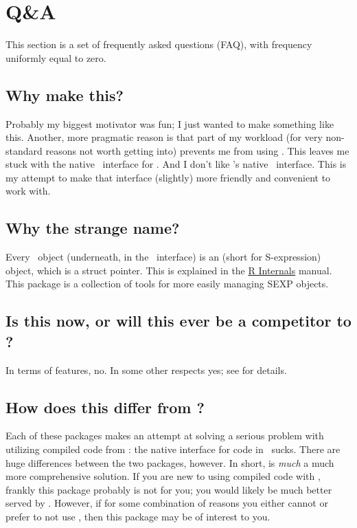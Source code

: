 \section{Q\&A}

This section is a set of frequently asked questions (FAQ), with frequency uniformly
equal to zero.


\subsection{Why make this?}

Probably my biggest motivator was fun; I just wanted to make something like this.  Another,
more pragmatic reason is that part of my workload (for very non-standard reasons not worth 
getting into) prevents me from using .  This leaves me stuck with the native \C\ 
interface for \R.  And I don't like \R's native \C\ interface.  This is my attempt to 
make that interface (slightly) more friendly and convenient to work with.


\subsection{Why the strange name?}

Every \R\ object (underneath, in the \C\ interface) is an  (short for
S-expression) object, which is a struct pointer.  This is explained in the
\href{http://cran.r-project.org/doc/manuals/R-ints.html#SEXPs}{R Internals} 
manual.  This package is a collection of tools for more easily managing SEXP 
objects.


\subsection{Is this now, or will this ever be a competitor to ?}
In terms of features, no.  In some other respects yes; see  for
details.


\subsection{How does this differ from ?}\label{sec:rcppdiffs}
Each of these packages makes an attempt at solving a serious problem with utilizing compiled
code from \R: the native interface for \proglang{C} code in \R\ sucks.  There are huge 
differences between the two packages, however. In short, \pkg{Rcpp} is \emph{much} a much 
more comprehensive solution.  If you are new to using compiled code with \R, frankly this 
package probably is not for you; you would likely be much better served by .  
However, if for some combination of reasons you either cannot or prefer to not use 
\pkg{Rcpp}, then this package may be of interest to you.

